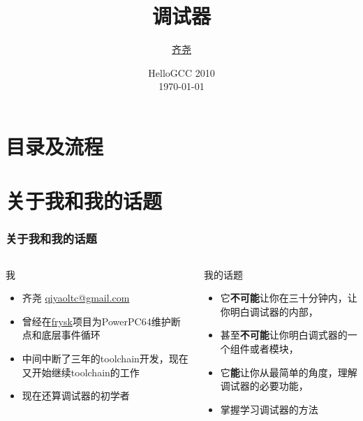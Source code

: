 \documentclass[cjk]{beamer}  %
\begin{document}
\begin{CJK}{UTF8}{gbsn}

\title{调试器}
\author{\href{mailto:qiyaoltc@gmail.com}{齐尧}}
\date{HelloGCC 2010 \\ \today}

\frame{\titlepage}


\section{目录及流程}
\frame{
    \tableofcontents
}

\section{关于我和我的话题}

\begin{frame}
  \frametitle{关于我和我的话题}
  \begin{columns}
    \column{5cm}
    \begin{overprint}

      \begin{block}{我}
        \begin{itemize}
        \item 齐尧 \href{mailto:qiyaoltc@gmail.com}{qiyaoltc@gmail.com}
        \item 曾经在\href{http://sourceware.org/frysk/}{frysk}项目为PowerPC64维护断点和底层事件循环
        \item 中间中断了三年的toolchain开发，现在又开始继续toolchain的工作
        \item 现在还算调试器的初学者
        \end{itemize}
      \end{block}

    \end{overprint}


    \column{5cm}
    \begin{overprint}

      \begin{block}{我的话题}
        \begin{itemize}
        \item 它\textbf{不可能}让你在三十分钟内，让你明白调试器的内部，
        \item 甚至\textbf{不可能}让你明白调式器的一个组件或者模块，
        \item 它\textbf{能}让你从最简单的角度，理解调试器的必要功能，
        \item 掌握学习调试器的方法
        \end{itemize}
      \end{block}


\end{overprint}
\end{columns}
\end{frame}
\end{CJK}
\end{document}

